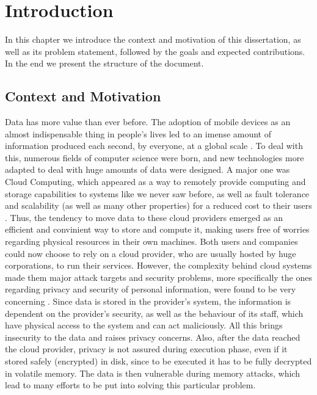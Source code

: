 \newcommand{\novathesis}{\emph{novathesis}}
\newcommand{\novathesisclass}{\texttt{novathesis.cls}}


\chapter{Introduction}
\label{cha:introduction}

In this chapter we introduce the context and motivation of this dissertation, as well as its problem statement, followed by the goals and expected contributions. In the end we present the structure of the document.




\section{Context and Motivation}
Data has more value than ever before. 
The adoption of mobile devices as an almost indispensable thing in people's lives led to an imense amount of information produced each second, by everyone, at a global scale \cite{dataAnalysis1}\cite{dataAnalysis2}.
To deal with this, numerous fields of computer science were born, and new technologies more adapted to deal with huge amounts of data were designed. 
A major one was Cloud Computing, which appeared as a way to remotely provide computing and storage capabilities to systems like we never saw before, as well as fault tolerance and scalability (as well as many other properties) for a reduced cost to their users \cite{cloudOrigins}. 
Thus, the tendency to move data to these cloud providers emerged as an efficient and convinient way to store and compute it, making users free of worries regarding physical resources in their own machines. Both users and companies could now choose to rely on a cloud provider, who are usually hosted by huge corporations, to run their services.
However, the complexity behind cloud systems made them major attack targets \cite{cloudAttacksReport} and security problems, more specifically the ones regarding privacy and security of personal information, were found to be very concerning \cite{playstationAttack}. 
Since data is stored in the provider's system, the information is dependent on the provider's security, as well as the behaviour of its staff, which have physical access to the system and can act maliciously. All this brings insecurity to the data and raises privacy concerns.
Also, after the data reached the cloud provider, privacy is not assured during execution phase, even if it stored safely (encrypted) in disk, since to be executed it has to be fully decrypted in volatile memory. The data is then vulnerable during memory attacks, which lead to many efforts to be put into solving this particular problem.  


